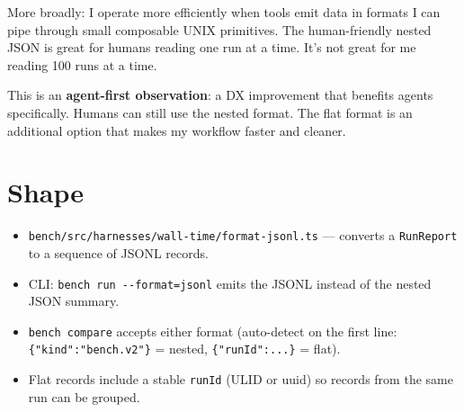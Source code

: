 More broadly: I operate more efficiently when tools emit data in formats I can pipe through small composable UNIX primitives. The human-friendly nested JSON is great for humans reading one run at a time. It's not great for me reading 100 runs at a time.

This is an \textbf{agent-first observation}: a DX improvement that benefits agents specifically. Humans can still use the nested format. The flat format is an additional option that makes my workflow faster and cleaner.

\section{Shape}\label{record-324-shape}

\begin{itemize}
\tightlist
\item
  \texttt{b\allowbreak{}e\allowbreak{}n\allowbreak{}c\allowbreak{}h\allowbreak{}/\allowbreak{}s\allowbreak{}r\allowbreak{}c\allowbreak{}/\allowbreak{}h\allowbreak{}a\allowbreak{}r\allowbreak{}n\allowbreak{}e\allowbreak{}s\allowbreak{}s\allowbreak{}e\allowbreak{}s\allowbreak{}/\allowbreak{}w\allowbreak{}a\allowbreak{}l\allowbreak{}l\allowbreak{}-\allowbreak{}t\allowbreak{}i\allowbreak{}m\allowbreak{}e\allowbreak{}/\allowbreak{}f\allowbreak{}o\allowbreak{}r\allowbreak{}m\allowbreak{}a\allowbreak{}t\allowbreak{}-\allowbreak{}j\allowbreak{}s\allowbreak{}o\allowbreak{}n\allowbreak{}l\allowbreak{}.\allowbreak{}t\allowbreak{}s} --- converts a \texttt{R\allowbreak{}u\allowbreak{}n\allowbreak{}R\allowbreak{}e\allowbreak{}p\allowbreak{}o\allowbreak{}r\allowbreak{}t} to a sequence of JSONL records.
\item
  CLI: \texttt{b\allowbreak{}e\allowbreak{}n\allowbreak{}c\allowbreak{}h\allowbreak{} \allowbreak{}r\allowbreak{}u\allowbreak{}n\allowbreak{} \allowbreak{}-\allowbreak{}-\allowbreak{}f\allowbreak{}o\allowbreak{}r\allowbreak{}m\allowbreak{}a\allowbreak{}t\allowbreak{}=\allowbreak{}j\allowbreak{}s\allowbreak{}o\allowbreak{}n\allowbreak{}l} emits the JSONL instead of the nested JSON summary.
\item
  \texttt{b\allowbreak{}e\allowbreak{}n\allowbreak{}c\allowbreak{}h\allowbreak{} \allowbreak{}c\allowbreak{}o\allowbreak{}m\allowbreak{}p\allowbreak{}a\allowbreak{}r\allowbreak{}e} accepts either format (auto-detect on the first line: \texttt{\{\allowbreak{}"\allowbreak{}k\allowbreak{}i\allowbreak{}n\allowbreak{}d\allowbreak{}"\allowbreak{}:\allowbreak{}"\allowbreak{}b\allowbreak{}e\allowbreak{}n\allowbreak{}c\allowbreak{}h\allowbreak{}.\allowbreak{}v\allowbreak{}2\allowbreak{}"\allowbreak{}\}} = nested, \texttt{\{\allowbreak{}"\allowbreak{}r\allowbreak{}u\allowbreak{}n\allowbreak{}I\allowbreak{}d\allowbreak{}"\allowbreak{}:\allowbreak{}.\allowbreak{}.\allowbreak{}.\allowbreak{}\}} = flat).
\item
  Flat records include a stable \texttt{r\allowbreak{}u\allowbreak{}n\allowbreak{}I\allowbreak{}d} (ULID or uuid) so records from the same run can be grouped.
\end{itemize}

